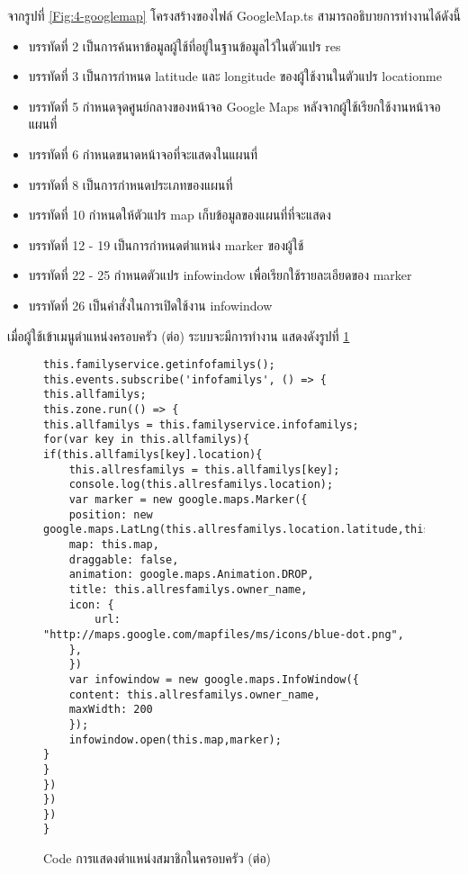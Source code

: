 จากรูปที่ \ref{Fig:4-googlemap} โครงสร้างของไฟล์ GoogleMap.ts สามารถอธิบายการทำงานได้ดังนี้
\begin{itemize}[label={--}]
\item บรรทัดที่ 2 เป็นการค้นหาข้อมูลผู้ใช้ที่อยู่ในฐานข้อมูลไว้ในตัวแปร res
\item บรรทัดที่ 3 เป็นการกำหนด latitude และ longitude ของผู้ใช้งานในตัวแปร locationme
\item บรรทัดที่ 5 กำหนดจุดศูนย์กลางของหน้าจอ Google Maps หลังจากผู้ใช้เรียกใช้งานหน้าจอแผนที่
\item บรรทัดที่ 6 กำหนดขนาดหน้าจอที่จะแสดงในแผนที่
\item บรรทัดที่ 8 เป็นการกำหนดประเภทของแผนที่
\item บรรทัดที่ 10 กำหนดให้ตัวแปร map เก็บข้อมูลของแผนที่ที่จะแสดง
\item บรรทัดที่ 12 - 19 เป็นการกำหนดตำแหน่ง marker ของผู้ใช้
\item บรรทัดที่ 22 - 25 กำหนดตัวแปร infowindow เพื่อเรียกใช้รายละเอียดของ marker
\item บรรทัดที่ 26 เป็นคำสั่งในการเปิดใช้งาน infowindow
\end{itemize}
\newpage



เมื่อผู้ใช้เข้าเมนูตำแหน่งครอบครัว (ต่อ) ระบบจะมีการทำงาน แสดงดังรูปที่ \ref{Fig:4-googlemapcon1}

\begin{figure}[H]
{\lstset{language=Pascal}
\begin{lstlisting}
this.familyservice.getinfofamilys();
this.events.subscribe('infofamilys', () => {
this.allfamilys;
this.zone.run(() => {
this.allfamilys = this.familyservice.infofamilys;
for(var key in this.allfamilys){
if(this.allfamilys[key].location){
	this.allresfamilys = this.allfamilys[key];
	console.log(this.allresfamilys.location);
	var marker = new google.maps.Marker({
	position: new google.maps.LatLng(this.allresfamilys.location.latitude,this.allresfamilys.location.longitude),
	map: this.map,
	draggable: false,
	animation: google.maps.Animation.DROP,
	title: this.allresfamilys.owner_name,
	icon: {
		url: "http://maps.google.com/mapfiles/ms/icons/blue-dot.png",
	},
	})
	var infowindow = new google.maps.InfoWindow({
	content: this.allresfamilys.owner_name,
	maxWidth: 200
	});
	infowindow.open(this.map,marker);
}
}
})
})
}) 
}
\end{lstlisting}}
\caption{Code การแสดงตำแหน่งสมาชิกในครอบครัว (ต่อ)}
\label{Fig:4-googlemapcon1}
\end{figure}
\newpage

